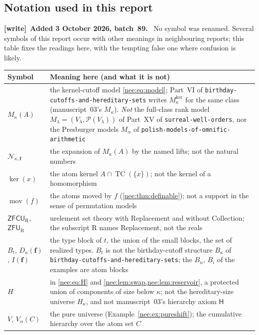 \documentclass[11pt,letterpaper]{article}
\numberwithin{equation}{section}
\theoremstyle{plain}
\theoremstyle{definition}
\theoremstyle{remark}
\newcommand{\ZFCUR}{\mathsf{ZFCU}_{\mathrm R}}
\newcommand{\ZFU}{\mathsf{ZFU}_{\mathrm R}}
\newcommand{\kerat}{\operatorname{ker}}
\newcommand{\TC}{\operatorname{TC}}
\newenvironment{writenote}[1][]{\par\smallskip\begingroup\small\raggedright
 \setlength{\parindent}{1.25em}\noindent\textbf{[write]}\if\relax\detokenize{#1}\relax\else~\textbf{#1.}\fi\ }%
 {\par\endgroup\smallskip}
\begin{document}
\subsection{Notation used in this report}
\label{nee:sec:notation}

\begin{writenote}[Added 3 October 2026, batch~89]
No symbol was renamed. Several symbols of this report occur with other meanings in neighbouring reports; this table fixes the readings here, with the tempting false one where confusion is likely.
\begin{center}\small
\begin{tabular}{>{\raggedright\arraybackslash}p{}>{\raggedright\arraybackslash}p{}}
\toprule
Symbol & Meaning here (and what it is not)\\
\midrule
$M_\kappa(A)$ & the kernel-cutoff model \eqref{nee:eq:model}; Part~VI of \nolinkurl{birthday-cutoffs-and-hereditary-sets} writes $M^{\mathrm{ker}}_\kappa$ for the same class (manuscript~03's $M_\kappa$). \emph{Not} the full-class rank model $M_\lambda=(V_\lambda,\mathcal P(V_\lambda))$ of Part~XV of \nolinkurl{surreal-well-orders}, nor the Presburger models $M_\alpha$ of \nolinkurl{polish-models-of-omnific-arithmetic}\\
$\mathcal N_{\kappa,\boldsymbol f}$ & the expansion of $M_\kappa(A)$ by the named lifts; not the natural numbers\\
$\kerat(x)$ & the atom kernel $A\cap\TC(\{x\})$; not the kernel of a homomorphism\\
$\operatorname{mov}(f)$ & the atoms moved by $f$ (\cref{nee:thm:definable}); not a support in the sense of permutation models\\
$\ZFCUR$, $\ZFU$ & urelement set theory with Replacement and without Collection; the subscript R names Replacement, not the reals\\
$B_t$, $D_\kappa(\boldsymbol f)$, $I(\boldsymbol f)$ & the type block of $t$, the union of the small blocks, the set of realized types. $B_t$ is not the birthday-cutoff structure $B_\kappa$ of \nolinkurl{birthday-cutoffs-and-hereditary-sets}; the $B_n$, $B_i$ of the examples are atom blocks\\
$H$ & in \eqref{nee:eq:H} and \cref{nee:lem:swap,nee:lem:reservoir}, a protected union of components of size below $\kappa$; not the hereditary-size universe $H_\kappa$, and not manuscript~03's hierarchy axiom $\mathsf H$\\
$V$, $V_\alpha(C)$ & the pure universe (Example~\ref{nee:ex:pureshift}); the cumulative hierarchy over the atom set $C$\\

\end{tabular}
\end{center}
\end{writenote}
\end{document}
